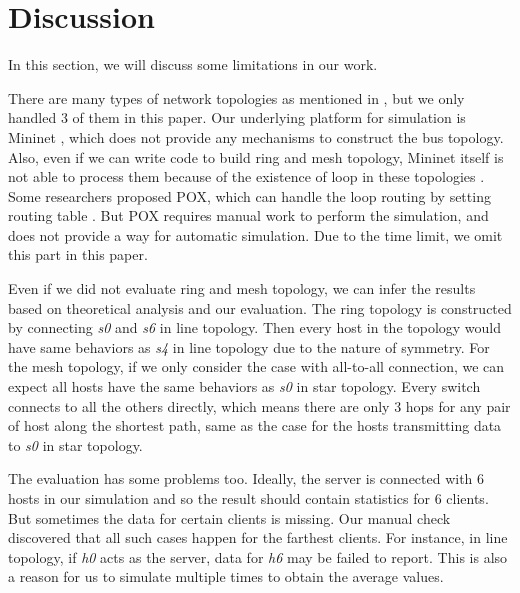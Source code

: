 \section{Discussion} \label{sec:discussion}

In this section, we will discuss some limitations in our work.

There are many types of network topologies as mentioned in \cite{NetworkTopo:wiki},
but we only handled 3 of them in this paper. Our underlying platform for simulation
is Mininet \cite{Mininet:official}, which does not provide any mechanisms to construct
the bus topology. Also, even if we can write code to build ring and mesh topology,
Mininet itself is not able to process them because of the existence of loop in these
topologies \cite{MininetFAQ:web}. Some researchers proposed POX, which can handle the
loop routing by setting routing table \cite{POX:web}. But POX requires manual work 
to perform the simulation, and does not provide a way for automatic simulation. 
Due to the time limit, we omit this part in this paper.

Even if we did not evaluate ring and mesh topology, we can infer the results based on 
theoretical analysis and our evaluation. The ring topology is constructed by connecting
{\it s0} and {\it s6} in line topology. Then every host in the topology would have same 
behaviors as {\it s4} in line topology due to the nature of symmetry. 
For the mesh topology, if we only consider the case with all-to-all connection, we can
expect all hosts have the same behaviors as {\it s0} in star topology. Every switch 
connects to all the others directly, which means there are only 3 hops for any pair
of host along the shortest path, same as the case for the hosts transmitting data to 
{\it s0} in star topology. 

The evaluation has some problems too. Ideally, the server is connected with 6 hosts in
our simulation and so the result should contain statistics for 6 clients. But sometimes
the data for certain clients is missing. Our manual check discovered that all such cases 
happen for the farthest clients. For instance, in line topology, if {\it h0} acts as the 
server, data for {\it h6} may be failed to report. This is also a reason for us to 
simulate multiple times to obtain the average values. 